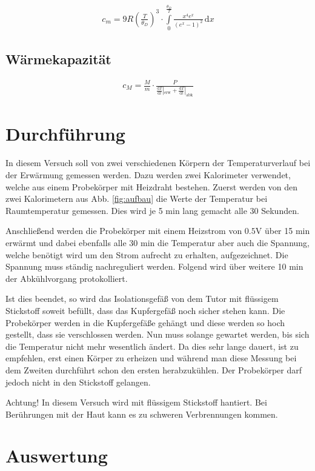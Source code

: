 \documentclass[12pt,a4paper,titlepage,headinclude,bibtotoc]{scrartcl}
\newcommand{\dif}{\ensuremath{\mathrm{d}}}
\begin{document}
\begin{align}
	c_m=9R \left(\frac{T}{\theta_D}\right)^3\cdot\int\limits_0^\frac{\theta_D}{T} \frac{x^4 e^x}{(e^x-1)^2} \,\dif x
	\label{eq:debye}
\end{align}

\subsection{Wärmekapazität}
\begin{align}
	c_M=\frac{M}{m}\cdot\frac{P}{\frac{\dif T}{\dif t}|_\text{erw}+\frac{\dif T}{\dif t}|_\text{abk}}
	\label{eq:molWaerme}
\end{align}

\section{Durchführung}
\label{sec:durchfuehrung}
In diesem Versuch soll von zwei verschiedenen Körpern der Temperaturverlauf bei der Erwärmung gemessen werden.
Dazu werden zwei Kalorimeter verwendet, welche aus einem Probekörper mit Heizdraht bestehen.
Zuerst werden von den zwei Kalorimetern aus Abb. \ref{fig:aufbau} die Werte der Temperatur bei Raumtemperatur gemessen.
Dies wird je 5 min lang gemacht alle 30 Sekunden.

Anschließend werden die Probekörper mit einem Heizstrom von $0.5\si\volt$ über 15 min erwärmt und dabei ebenfalls alle 30 min die Temperatur aber auch die Spannung, welche benötigt wird um den Strom aufrecht zu erhalten, aufgezeichnet.
Die Spannung muss ständig nachreguliert werden.
Folgend wird über weitere 10 min der Abkühlvorgang protokolliert.

Ist dies beendet, so wird das Isolationsgefäß von dem Tutor mit flüssigem Stickstoff soweit befüllt, dass das Kupfergefäß noch sicher stehen kann.
Die Probekörper werden in die Kupfergefäße gehängt und diese werden so hoch gestellt, dass sie verschlossen werden.
Nun muss solange gewartet werden, bis sich die Temperatur  nicht mehr wesentlich ändert.
Da dies sehr lange dauert, ist zu empfehlen, erst einen Körper zu erheizen und während man diese Messung bei dem Zweiten durchführt schon den ersten herabzukühlen.
Der Probekörper darf jedoch nicht in den Stickstoff gelangen.\newline

Achtung! In diesem Versuch wird mit flüssigem Stickstoff hantiert.
Bei Berührungen mit der Haut kann es zu schweren Verbrennungen kommen.

\section{Auswertung}
\label{sec:auswertung}
\end{document}
